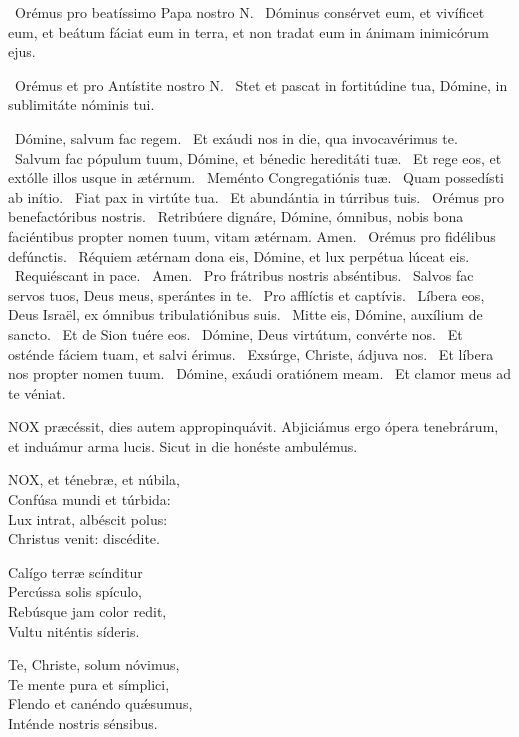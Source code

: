 \V\ Orémus pro beatíssimo Papa nostro N. \R\ Dóminus consérvet eum, et vivíficet eum, et beátum fáciat eum in terra, et non tradat eum in ánimam inimicórum ejus.

\V\ Orémus et pro Antístite nostro N. \R\ Stet et pascat in fortitúdine tua, Dómine, in sublimitáte nóminis tui.

\V\ Dómine, salvum fac regem. \R\ Et exáudi nos in die, qua invocavérimus te. \V\ Salvum fac pópulum tuum, Dómine, et bénedic hereditáti tuæ. \R\ Et rege eos, et extólle illos usque in ætérnum. \V\ Meménto Congregatiónis tuæ. \R\ Quam possedísti ab inítio. \V\ Fiat pax in virtúte tua. \R\ Et abundántia in túrribus tuis. \V\ Orémus pro benefactóribus nostris. \R\ Retribúere dignáre, Dómine, ómnibus, nobis bona faciéntibus propter nomen tuum, vitam ætérnam. Amen. \V\ Orémus pro fidélibus defúnctis. \R\ Réquiem ætérnam dona eis, Dómine, et lux perpétua lúceat eis. \V\ Requiéscant in pace. \R\ Amen. \V\ Pro frátribus nostris abséntibus. \R\ Salvos fac servos tuos, Deus meus, sperántes in te. \V\ Pro afflíctis et captívis. \R\ Líbera eos, Deus Israël, ex ómnibus tribulatiónibus suis. \V\ Mitte eis, Dómine, auxílium de sancto. \R\ Et de Sion tuére eos. \V\ Dómine, Deus virtútum, convérte nos. \R\ Et osténde fáciem tuam, et salvi érimus. \V\ Exsúrge, Christe, ádjuva nos. \R\ Et líbera nos propter nomen tuum. \V\ Dómine, exáudi oratiónem meam. \R\ Et clamor meus ad te véniat.




\lettrine[lines=2]{N}{OX} præcéssit, dies autem appropinquávit. Abjiciámus ergo ópera tenebrárum, et induámur arma lucis. Sicut in die honéste ambulémus.


\lettrine[lines=2]{N}{OX}, et ténebræ, et núbila,\\
Confúsa mundi et túrbida:\\
Lux intrat, albéscit polus:\\
Christus venit: discédite.

Calígo terræ scínditur\\
Percússa solis spículo,\\
Rebúsque jam color redit,\\
Vultu niténtis síderis.

Te, Christe, solum nóvimus,\\
Te mente pura et símplici,\\
Flendo et canéndo quǽsumus,\\
Inténde nostris sénsibus.

